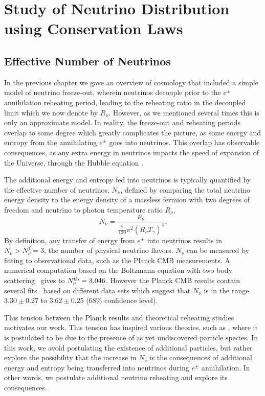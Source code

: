 \section{ Study of Neutrino Distribution using Conservation Laws}\label{ch:model_ind}

\subsection{Effective Number of Neutrinos}\label{sec:N_nu}
In the previous chapter we gave an overview of cosmology that included a simple model of neutrino freeze-out, wherein neutrinos decouple prior to the $e^\pm$ annihilation reheating period, leading to the reheating ratio in the decoupled limit  which we now denote by $R_\nu$. However, as we mentioned several times this is only an approximate model. In reality, the freeze-out and reheating periods overlap to some degree which greatly complicates the picture, as some energy and entropy from the annihilating $e^\pm$ goes into neutrinos.  This overlap has observable consequences, as any extra energy in neutrinos impacts the speed of expansion of the Universe, through the Hubble equation .

The additional energy and entropy fed into neutrinos is typically quantified by the effective number of neutrinos, $N_\nu$, defined by comparing the total neutrino energy density to the energy density of a massless fermion with two degrees of freedom and neutrino to photon temperature ratio $R_\nu$,
\begin{equation}
N_{\nu}=\frac{\rho_\nu}{\frac{7}{120}\pi^2  \left(R_\nu T_\gamma\right)^4}.
\end{equation}
 By definition, any transfer of energy from $e^\pm$ into neutrinos results in $N_\nu>N_\nu^f=3$, the number of physical neutrino flavors.  $N_\nu$ can be  measured by fitting to observational data, such as the Planck CMB measurements. A numerical computation based on the Boltzmann equation with two body scattering~\cite{Mangano2005} gives to $N_{\nu}^{\rm th}=3.046$. However the Planck CMB results contain several fits~\cite{Planck} based on different data sets which suggest that $N_\nu$ is in the range $3.30\pm 0.27$ to $3.62\pm0.25$ ($68\%$ confidence level). 

This tension between the Planck results and theoretical reheating studies motivates our work. This tension has inspired various theories, such as \cite{Weinberg:2013kea}, where it is postulated to be due to the presence of as yet undiscovered particle species. In this work, we avoid postulating the existence of additional particles, but rather explore the possibility that the increase in $N_\nu$ is the consequences of additional energy and entropy being transferred into neutrinos during $e^\pm$ annihilation.  In other words, we postulate additional neutrino reheating and explore its consequences.



